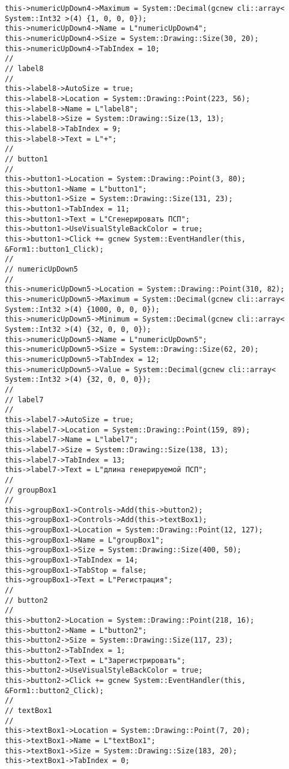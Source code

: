 \begin{lstlisting}[caption = {ОСНОВНАЯ ПОЛЕЗНАЯ ПРОГРАММА}, label = {4.cpp}]
this->numericUpDown4->Maximum = System::Decimal(gcnew cli::array< System::Int32 >(4) {1, 0, 0, 0});
this->numericUpDown4->Name = L"numericUpDown4";
this->numericUpDown4->Size = System::Drawing::Size(30, 20);
this->numericUpDown4->TabIndex = 10;
// 
// label8
// 
this->label8->AutoSize = true;
this->label8->Location = System::Drawing::Point(223, 56);
this->label8->Name = L"label8";
this->label8->Size = System::Drawing::Size(13, 13);
this->label8->TabIndex = 9;
this->label8->Text = L"+";
// 
// button1
// 
this->button1->Location = System::Drawing::Point(3, 80);
this->button1->Name = L"button1";
this->button1->Size = System::Drawing::Size(131, 23);
this->button1->TabIndex = 11;
this->button1->Text = L"Сгенерировать ПСП";
this->button1->UseVisualStyleBackColor = true;
this->button1->Click += gcnew System::EventHandler(this, &Form1::button1_Click);
// 
// numericUpDown5
// 
this->numericUpDown5->Location = System::Drawing::Point(310, 82);
this->numericUpDown5->Maximum = System::Decimal(gcnew cli::array< System::Int32 >(4) {1000, 0, 0, 0});
this->numericUpDown5->Minimum = System::Decimal(gcnew cli::array< System::Int32 >(4) {32, 0, 0, 0});
this->numericUpDown5->Name = L"numericUpDown5";
this->numericUpDown5->Size = System::Drawing::Size(62, 20);
this->numericUpDown5->TabIndex = 12;
this->numericUpDown5->Value = System::Decimal(gcnew cli::array< System::Int32 >(4) {32, 0, 0, 0});
// 
// label7
// 
this->label7->AutoSize = true;
this->label7->Location = System::Drawing::Point(159, 89);
this->label7->Name = L"label7";
this->label7->Size = System::Drawing::Size(138, 13);
this->label7->TabIndex = 13;
this->label7->Text = L"длина генерируемой ПСП";
// 
// groupBox1
// 
this->groupBox1->Controls->Add(this->button2);
this->groupBox1->Controls->Add(this->textBox1);
this->groupBox1->Location = System::Drawing::Point(12, 127);
this->groupBox1->Name = L"groupBox1";
this->groupBox1->Size = System::Drawing::Size(400, 50);
this->groupBox1->TabIndex = 14;
this->groupBox1->TabStop = false;
this->groupBox1->Text = L"Регистрация";
// 
// button2
// 
this->button2->Location = System::Drawing::Point(218, 16);
this->button2->Name = L"button2";
this->button2->Size = System::Drawing::Size(117, 23);
this->button2->TabIndex = 1;
this->button2->Text = L"Зарегистрировать";
this->button2->UseVisualStyleBackColor = true;
this->button2->Click += gcnew System::EventHandler(this, &Form1::button2_Click);
// 
// textBox1
// 
this->textBox1->Location = System::Drawing::Point(7, 20);
this->textBox1->Name = L"textBox1";
this->textBox1->Size = System::Drawing::Size(183, 20);
this->textBox1->TabIndex = 0;

\end{lstlisting}
